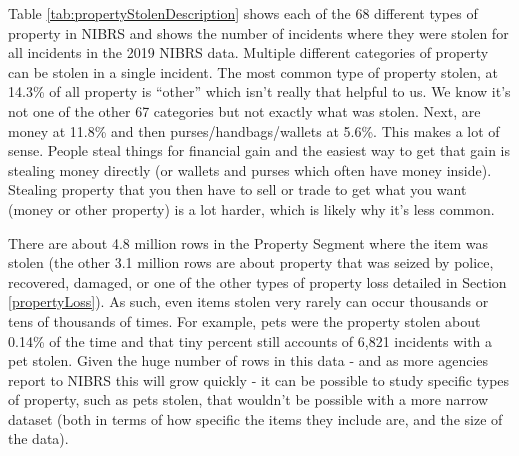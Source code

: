 \documentclass[
  12pt,
  openany]{book}
\begin{document}
Table \ref{tab:propertyStolenDescription} shows each of the 68 different types of property in NIBRS and shows the number of incidents where they were stolen for all incidents in the 2019 NIBRS data. Multiple different categories of property can be stolen in a single incident. The most common type of property stolen, at 14.3\% of all property is ``other'' which isn't really that helpful to us. We know it's not one of the other 67 categories but not exactly what was stolen. Next, are money at 11.8\% and then purses/handbags/wallets at 5.6\%. This makes a lot of sense. People steal things for financial gain and the easiest way to get that gain is stealing money directly (or wallets and purses which often have money inside). Stealing property that you then have to sell or trade to get what you want (money or other property) is a lot harder, which is likely why it's less common.

There are about 4.8 million rows in the Property Segment where the item was stolen (the other 3.1 million rows are about property that was seized by police, recovered, damaged, or one of the other types of property loss detailed in Section \ref{propertyLoss}). As such, even items stolen very rarely can occur thousands or tens of thousands of times. For example, pets were the property stolen about 0.14\% of the time and that tiny percent still accounts of 6,821 incidents with a pet stolen. Given the huge number of rows in this data - and as more agencies report to NIBRS this will grow quickly - it can be possible to study specific types of property, such as pets stolen, that wouldn't be possible with a more narrow dataset (both in terms of how specific the items they include are, and the size of the data).
\end{document}
